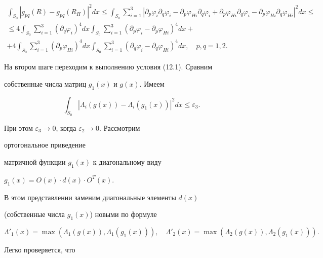 \begin{pf}
\begin{multline*}
\int_{S_0}|g_{pq}(R)-g_{pq}(R_H)|^2dx\le\int_{S_0}


\sum^3_{i=1}|\partial_p\varphi_i\partial_q\varphi_i-


\partial_p\varphi_{Hi}\partial_q\varphi_i+


\partial_p\varphi_{Hi}\partial_q\varphi_i-


\partial_p\varphi_{Hi}\partial_q\varphi_{Hi}|^2dx\le \\


%


\le 4\int_{S_0}\sum^3_{i=1}(\partial_q\varphi_i)^4dx


\int_{S_0}\sum^3_{i=1}(\partial_p\varphi_i-\partial_p\varphi_{Hi})^4


dx+\\


%


+4\int_{S_0}\sum^3_{i=1}(\partial_p\varphi_{Hi})^4dx


\int_{S_0}\sum^3_{i=1}(\partial_q\varphi_i-\partial_q\varphi_{Hi}


)^4dx,\quad p,q=1,2.


\end{multline*}





На втором шаге переходим к выполнению условия (12.1). Сравним


собственные числа матриц $g_1(x)$ и $g(x)$. Имеем


$$


\int_{S_0}|\Lambda_i(g(x))-\Lambda_i(g_1(x))|^2dx\le \varepsilon_3.


$$


При этом $\varepsilon_3\to 0$, когда $\varepsilon_2\to 0$. Рассмотрим


ортогональное приведение


матричной функции $g_1(x)$ к диагональному виду


$g_1(x)=O(x)\cdot d(x)\cdot O^T(x)$.


В этом представлении заменим диагональные элементы $d(x)$


(собственные числа $g_1(x)$) новыми по формуле


$$


\Lambda'_1(x)=\max(\Lambda_1(g(x)),\Lambda_1(g_1(x))),\quad


\Lambda'_2(x)=\max(\Lambda_2(g(x)),\Lambda_2(g_1(x))).


$$


Легко проверяется, что



\end{pf}
